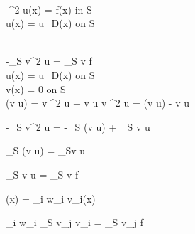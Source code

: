 \\
-\nabla^2 u(x) = f(x) \textrm{ in } S\\
u(x) = u_D(x) \textrm{ on } \partial S


\\
-\int_S v\nabla^2 u = \int_S v f\\
u(x) = u_D(x) \textrm{ on } \partial S\\
v(x) = 0 \textrm{ on } \partial S\\

\nabla(v \cdot \nabla u) = v \nabla^2 u + \nabla v \cdot \nabla u \rightarrow
 v \nabla^2 u  = \nabla(v \cdot \nabla u) - \nabla v \cdot \nabla u

-\int_S v\nabla^2 u = -\int_S \nabla(v \cdot \nabla u) + \int_S \nabla v \cdot \nabla u

\int_S \nabla(v \cdot \nabla u) = \int_{\partial S}v \cdot \nabla u

\int_S \nabla v \cdot \nabla u = \int_S v f

(x) = \sum_i w_i v_i(x)

\sum_i w_i \int_S \nabla v_j \cdot \nabla v_i = \int_S v_j f
